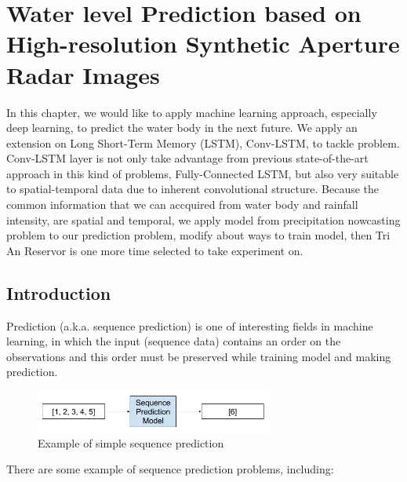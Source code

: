 \chapter{Water level Prediction based on High-resolution Synthetic Aperture Radar Images}
\label{chap-5-predict-from-sar-image}
\begin{ChapAbstract}
In this chapter, we would like to apply machine learning approach, especially deep learning, to predict the water body in the next future. We apply an extension on Long Short-Term Memory (LSTM), Conv-LSTM, to tackle problem. Conv-LSTM layer is not only take advantage from previous state-of-the-art approach in this kind of problems, Fully-Connected LSTM, but also very suitable to spatial-temporal data due to inherent convolutional structure. Because the common information that we can accquired from water body and rainfall intensity, are spatial and temporal, we apply model from precipitation nowcasting problem to our prediction problem, modify about ways to train model, then Tri An Reservor is one more time selected to take experiment on. 

\end{ChapAbstract}

\section{Introduction}


Prediction (a.k.a. sequence prediction) is one of interesting fields in machine learning, in which the input (sequence data) contains an order on the observations and this order must be preserved while training model and making prediction.

\begin{figure}[h!]
	\centering
	\includegraphics[width=0.7\textwidth]{figures/Example-of-a-Sequence-Prediction-Problem.png}
	\caption[]{Example of simple sequence prediction}
	\label{fig:exampleSimpleSequencePrediction}
\end{figure}

There are some example of sequence prediction problems, including:

